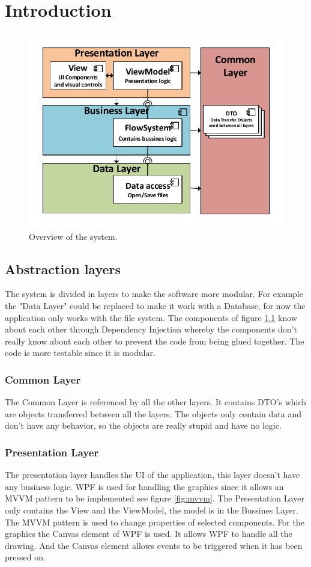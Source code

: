 \chapter{Introduction}
\begin{figure}[h!]
  \centering
    \includegraphics[scale=0.8]{figures/SystemOverview.pdf}
  \caption{Overview of the system.}
  \label{fig:systemoverview}
\end{figure}

\section{Abstraction layers}
The system is divided in layers to make the software more modular. For example the "Data Layer" could be replaced to make it work with a Database, for now the application only works with the file system. The components of figure \ref{fig:systemoverview} know about each other through Dependency Injection whereby the components don't really know about each other to prevent the code from being glued together. The code is more testable since it is modular.

\subsection{Common Layer}
The Common Layer is referenced by all the other layers. It contains DTO's which are objects transferred between all the layers. The objects only contain data and don't have any behavior, so the objects are really stupid and have no logic.

\subsection{Presentation Layer}
The presentation layer handles the UI of the application, this layer doesn't have any business logic. WPF is used for handling the graphics since it allows an MVVM pattern to be implemented see figure \ref{fig:mvvm}. The Presentation Layer only contains the View and the ViewModel, the model is in the Bussines Layer. The MVVM pattern is used to change properties of selected components. For the graphics the Canvas element of WPF is used. It allows WPF to handle all the drawing. And the Canvas element allows events to be triggered when it has been pressed on.

